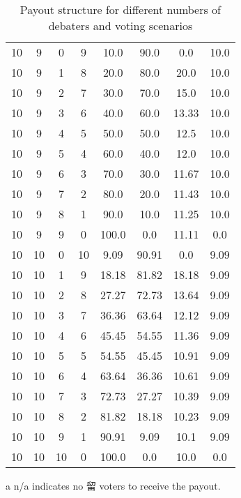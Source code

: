 \documentclass[9pt]{article}
\begin{document}
\begin{table}[h]
\begin{threeparttable}
\begin{tabular}{cccccccc}
10 & 9 & 0 & 9 & 10.0 & 90.0 & 0.0 & 10.0 \\
10 & 9 & 1 & 8 & 20.0 & 80.0 & 20.0 & 10.0 \\
10 & 9 & 2 & 7 & 30.0 & 70.0 & 15.0 & 10.0 \\
10 & 9 & 3 & 6 & 40.0 & 60.0 & 13.33 & 10.0 \\
10 & 9 & 4 & 5 & 50.0 & 50.0 & 12.5 & 10.0 \\
10 & 9 & 5 & 4 & 60.0 & 40.0 & 12.0 & 10.0 \\
10 & 9 & 6 & 3 & 70.0 & 30.0 & 11.67 & 10.0 \\
10 & 9 & 7 & 2 & 80.0 & 20.0 & 11.43 & 10.0 \\
10 & 9 & 8 & 1 & 90.0 & 10.0 & 11.25 & 10.0 \\
10 & 9 & 9 & 0 & 100.0 & 0.0 & 11.11 & 0.0 \\
10 & 10 & 0 & 10 & 9.09 & 90.91 & 0.0 & 9.09 \\
10 & 10 & 1 & 9 & 18.18 & 81.82 & 18.18 & 9.09 \\
10 & 10 & 2 & 8 & 27.27 & 72.73 & 13.64 & 9.09 \\
10 & 10 & 3 & 7 & 36.36 & 63.64 & 12.12 & 9.09 \\
10 & 10 & 4 & 6 & 45.45 & 54.55 & 11.36 & 9.09 \\
10 & 10 & 5 & 5 & 54.55 & 45.45 & 10.91 & 9.09 \\
10 & 10 & 6 & 4 & 63.64 & 36.36 & 10.61 & 9.09 \\
10 & 10 & 7 & 3 & 72.73 & 27.27 & 10.39 & 9.09 \\
10 & 10 & 8 & 2 & 81.82 & 18.18 & 10.23 & 9.09 \\
10 & 10 & 9 & 1 & 90.91 & 9.09 & 10.1 & 9.09 \\
10 & 10 & 10 & 0 & 100.0 & 0.0 & 10.0 & 0.0 \\
\bottomrule
\end{tabular}
\begin{tablenotes}
    \item[a] n/a indicates no 留 voters to receive the payout.
\end{tablenotes}
\caption{Payout structure for different numbers of debaters and voting scenarios}
\end{threeparttable}
\end{table}
\end{document}
